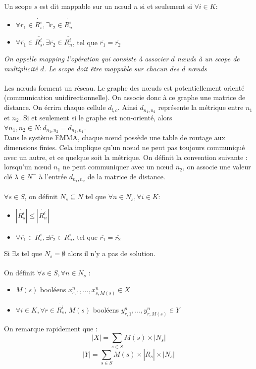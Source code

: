\documentclass[11pt,a4paper]{article} %
\begin{document}
Un scope $s$ est dit mappable sur un nœud $n$ si et seulement si $\forall i \in K$:\begin{itemize}
\item $\forall \dot{r_1} \in \dot{R_s^i}, \exists \dot{r_2} \in \dot{R_n^i}$
\item $\forall \overline{r_1} \in \overline{R_s^i}, \exists \overline{r_2} \in \overline{R_n^i}$, tel que $\overline{r_1} = \overline{r_2}$\\
\end{itemize}

\textit{On appelle mapping l'opération qui consiste à associer $d$ nœuds à un scope de multiplicité $d$. Le scope doit être mappable sur chacun des $d$ nœuds}\\\\
Les nœuds forment un réseau. Le graphe des nœuds est potentiellement orienté (communication unidirectionnelle). On associe donc à ce graphe une matrice de distance. On écrira chaque cellule $d_{l,c}$. Ainsi $d_{n_1,n_2}$ représente la métrique entre $n_1$ et $n_2$. Si et seulement si le graphe est non-orienté, alors $\forall n_1,n_2 \in N : d_{n_1,n_2} = d_{n_2,n_1}$.\\
Dans le système EMMA, chaque nœud possède une table de routage aux dimensions finies. Cela implique qu'un nœud ne peut pas toujours communiqué avec un autre, et ce quelque soit la métrique. On définit la convention suivante : lorsqu'un nœud $n_1$ ne peut communiquer avec un nœud $n_2$, on associe une valeur clé $\lambda \in N^-$ à l'entrée $d_{n_1,n_2}$ de la matrice de distance.\\\\
$\forall s \in S$, on définit $N_s \subseteq N$ tel que $\forall n \in N_s, \forall i \in K$:\begin{itemize}
\item $|\dot{R_s^i}| \leq |\dot{R_n^i}|$
\item $\forall \overline{r_1} \in \overline{R_s^i}, \exists \overline{r_2} \in \overline{R_n^i}$, tel que $\overline{r_1} = \overline{r_2}$
\end{itemize}
Si $\exists s$ tel que $N_s = \emptyset$ alors il n'y a pas de solution.\\\\
On définit $\forall s \in S, \forall n \in N_s$ :
\begin{itemize}
\item $M(s)$ booléens $x_{s,1}^n,...,x_{s,M(s)}^n \in X$
\item $\forall i \in K, \forall r \in \dot{R_s^i}$, $M(s)$ booléens $y_{r,1}^n,...,y_{r,M(s)}^n \in Y$\\
\end{itemize}
On remarque rapidement que :
\[|X| = \sum_{s \in S} M(s) \times |N_s|\]
\[|Y| = \sum_{s \in S} M(s) \times |\dot{R_s}| \times |N_s|\]
\end{document}
